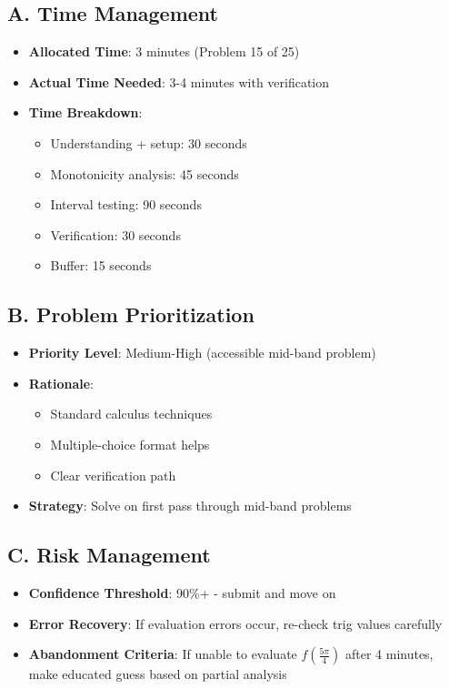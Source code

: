 \documentclass[]{article}
\begin{document}
\begin{competitionbox}
\subsection*{A. Time Management}
\begin{itemize}[leftmargin=*]
    \item \textbf{Allocated Time}: 3 minutes (Problem 15 of 25)
    \item \textbf{Actual Time Needed}: 3-4 minutes with verification
    \item \textbf{Time Breakdown}:
    \begin{itemize}
        \item Understanding + setup: 30 seconds
        \item Monotonicity analysis: 45 seconds
        \item Interval testing: 90 seconds
        \item Verification: 30 seconds
        \item Buffer: 15 seconds
    \end{itemize}
\end{itemize}

\subsection*{B. Problem Prioritization}
\begin{itemize}[leftmargin=*]
    \item \textbf{Priority Level}: Medium-High (accessible mid-band problem)
    \item \textbf{Rationale}: 
    \begin{itemize}
        \item Standard calculus techniques
        \item Multiple-choice format helps
        \item Clear verification path
    \end{itemize}
    \item \textbf{Strategy}: Solve on first pass through mid-band problems
\end{itemize}

\subsection*{C. Risk Management}
\begin{itemize}[leftmargin=*]
    \item \textbf{Confidence Threshold}: 90\%+ - submit and move on
    \item \textbf{Error Recovery}: If evaluation errors occur, re-check trig values carefully
    \item \textbf{Abandonment Criteria}: If unable to evaluate $f(\frac{5\pi}{4})$ after 4 minutes, make educated guess based on partial analysis
\end{itemize}


\end{competitionbox}
\end{document}

